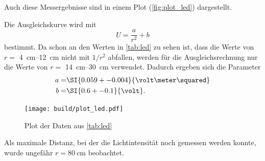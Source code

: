 Auch diese Messergebnisse sind in einem Plot (\autoref{fig:plot_led}) dargestellt.

Die Ausgleichskurve wird mit 
\begin{equation}
    U = \frac{a}{r^2} + b
\end{equation}
bestimmt. Da schon an den Werten in \autoref{tab:led} zu sehen ist, dass die Werte von $r =$ \SIrange{4}{12}{\centi\meter} nicht mit $1/r^2$ abfallen,
werden für die Ausgleichsrechnung nur die Werte von $r =$ \SIrange{14}{30}{\centi\meter} verwendet.
Dadurch ergeben sich die Parameter
\begin{align*}
    a =& \SI{0.059+-0.004}{\volt\meter\squared} \\
    b =& \SI{0.6+-0.1}{\volt}.
\end{align*}

\begin{figure}
    \centering
    \texttt{[image: build/plot\_led.pdf]}
    \caption{Plot der Daten aus \autoref{tab:led}}
    \label{fig:plot_led}
\end{figure}

Als maximale Distanz, bei der die Lichtintensität noch gemessen werden konnte, wurde ungefähr $r=\SI{80}{\centi\meter}$ beobachtet.